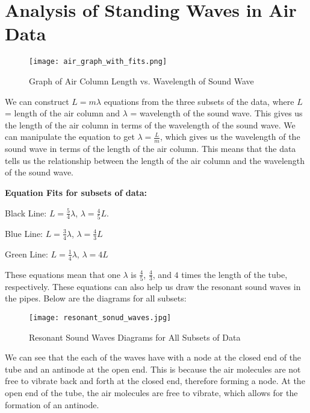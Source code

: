 \documentclass[11pt,twoside]{article}
\begin{document}

\section{Analysis of Standing Waves in Air Data}

\begin{figure}[H]
    \centering
    \texttt{[image: air\_graph\_with\_fits.png]}
    \caption{Graph of Air Column Length vs. Wavelength of Sound Wave}
\end{figure}

 We can construct $L = m\lambda$ equations from the three subsets of the data, where $L$ = length of the air column and $\lambda$ = wavelength of the sound wave. This gives us the length of the air column in terms of the wavelength of the sound wave. We can manipulate the equation to get $\lambda = \frac{L}{m}$, which gives us the wavelength of the sound wave in terms of the length of the air column. This means that the data tells us the relationship between the length of the air column and the wavelength of the sound wave.
 
\textbf{Equation Fits for subsets of data:}

Black Line: $L =\frac{5}{4}\lambda$, $\lambda = \frac{4}{5}L$. 

Blue Line: $L =\frac{3}{4}\lambda$, $\lambda = \frac{4}{3}L$

Green Line: $L = \frac{1}{4}\lambda$, $\lambda = 4L$

These equations mean that one $\lambda$ is $\frac{4}{5}$, $\frac{4}{3}$, and $4$ times the length of the tube, respectively. These equations can also help us draw the resonant sound waves in the pipes. Below are the diagrams for all subsets:

\begin{figure}[H]
    \centering
    \texttt{[image: resonant\_sonud\_waves.jpg]}
    \caption{Resonant Sound Waves Diagrams for All Subsets of Data}
\end{figure}

We can see that the each of the waves have with a node at the closed end of the tube and an antinode at the open end. This is because the air molecules are not free to vibrate back and forth at the closed end, therefore forming a node. At the open end of the tube, the air molecules are free to vibrate, which allows for the formation of an antinode. 
\end{document}
